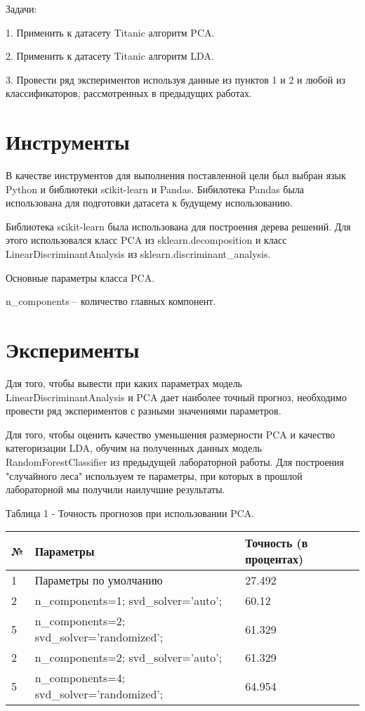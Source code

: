 \documentclass[a4paper,12pt]{article}
\begin{document}
	\vspace{0.5cm}
	Задачи: 
	
	\vspace{0.5cm}
	1. Применить к датасету Titanic алгоритм PCA.
	
	\vspace{0.5cm}
	2. Применить к датасету Titanic алгоритм LDA.
	
	\vspace{0.5cm}
	3. Провести ряд экспериментов используя данные из пунктов 1 и 2 и любой из классификаторов, рассмотренных в предыдущих работах.
	
	
\newpage\section{Инструменты} 
	В качестве инструментов для выполнения поставленной цели был выбран язык Python и библиотеки sсikit-learn и Pandas.
	Бибилотека Pandas была использована для подготовки датасета к будущему использованию.
	
	\vspace{0.5cm}
	Библиотека sсikit-learn была использована для построения дерева решений. Для этого использовался класс PCA из sklearn.decomposition и класс LinearDiscriminantAnalysis из sklearn.discriminant\_analysis.
	
	\vspace{0.5cm}
	Основные параметры класса PCA.
	
	\vspace{0.5cm}
	n\_components – количество главных компонент.

	
\newpage\section{Эксперименты}
	Для того, чтобы вывести при каких параметрах модель LinearDiscriminantAnalysis и PCA дает наиболее точный прогноз, необходимо провести ряд экспериментов с разными значениями параметров. 
	
	\vspace{0.5cm}
	Для того, чтобы оценить качество уменьшения размерности PCA и качество категоризации LDA,  обучим на полученных данных модель RandomForestClassifier из предыдущей лабораторной работы. Для построения "случайного леса" используем те параметры, при которых в прошлой лабораторной мы получили наилучшие результаты.


	\vspace{0.5cm}
	Таблица 1 - Точность прогнозов  при использовании PCA.
\begin{longtable}{|p{1cm}|p{9cm}|p{3cm}|}
\hline
№ & Параметры & Точность (в процентах) \\ 
\hline 
1 & Параметры по умолчанию & 27.492 \\
\hline
2 & n\_components=1; svd\_solver='auto';  & 60.12 \\
\hline 
5 & n\_components=2; svd\_solver='randomized';& 61.329 \\
\hline
2 & n\_components=2; svd\_solver='auto';  & 61.329 \\
\hline 
5 & n\_components=4; svd\_solver='randomized'; & 64.954 \\
\hline
\end{longtable}
\end{document}

